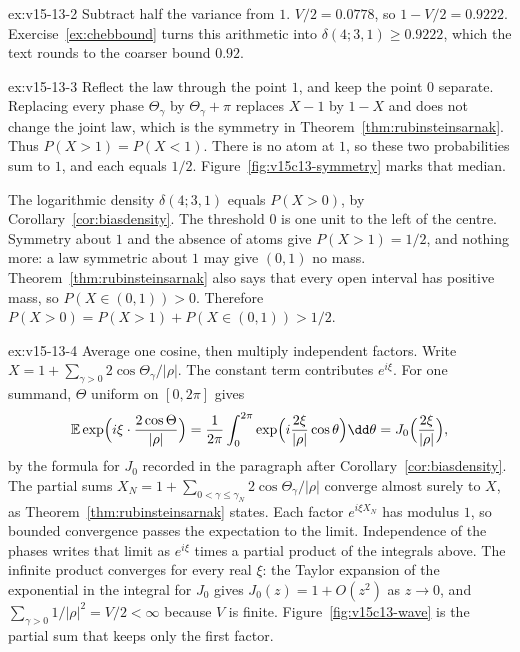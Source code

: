 \begin{solution}{ex:v15-13-2}
\idea Subtract half the variance from \(1\).
\writeup \(V/2=0.0778\), so \(1-V/2=0.9222\). Exercise~\ref{ex:chebbound} turns this arithmetic into \(\delta(4;3,1)\ge0.9222\), which the text rounds to the coarser bound \(0.92\).
\end{solution}

\begin{solution}{ex:v15-13-3}
\idea Reflect the law through the point \(1\), and keep the point \(0\) separate.
\writeup Replacing every phase \(\Theta_\gamma\) by \(\Theta_\gamma+\pi\) replaces \(X-1\) by \(1-X\) and does not change the joint law, which is the symmetry in Theorem~\ref{thm:rubinsteinsarnak}. Thus \(P(X>1)=P(X<1)\). There is no atom at \(1\), so these two probabilities sum to \(1\), and each equals \(1/2\). Figure~\ref{fig:v15c13-symmetry} marks that median.

The logarithmic density \(\delta(4;3,1)\) equals \(P(X>0)\), by Corollary~\ref{cor:biasdensity}. The threshold \(0\) is one unit to the left of the centre. Symmetry about \(1\) and the absence of atoms give \(P(X>1)=1/2\), and nothing more: a law symmetric about \(1\) may give \((0,1)\) no mass. Theorem~\ref{thm:rubinsteinsarnak} also says that every open interval has positive mass, so \(P(X\in(0,1))>0\). Therefore \(P(X>0)=P(X>1)+P(X\in(0,1))>1/2\).
\end{solution}

\begin{solution}{ex:v15-13-4}
\idea Average one cosine, then multiply independent factors.
\writeup Write \(X=1+\sum_{\gamma>0}2\cos\Theta_\gamma/|\rho|\). The constant term contributes \(e^{i\xi}\). For one summand, \(\Theta\) uniform on \([0,2\pi]\) gives
\[
\mathbb E\exp\Bigl(i\xi\cdot\frac{2\cos\Theta}{|\rho|}\Bigr)
=\frac1{2\pi}\int_0^{2\pi}\exp\Bigl(i\frac{2\xi}{|\rho|}\cos\theta\Bigr)\dd\theta
=J_0\Bigl(\frac{2\xi}{|\rho|}\Bigr),
\]
by the formula for \(J_0\) recorded in the paragraph after Corollary~\ref{cor:biasdensity}. The partial sums \(X_N=1+\sum_{0<\gamma\le\gamma_N}2\cos\Theta_\gamma/|\rho|\) converge almost surely to \(X\), as Theorem~\ref{thm:rubinsteinsarnak} states. Each factor \(e^{i\xi X_N}\) has modulus \(1\), so bounded convergence passes the expectation to the limit. Independence of the phases writes that limit as \(e^{i\xi}\) times a partial product of the integrals above. The infinite product converges for every real \(\xi\): the Taylor expansion of the exponential in the integral for \(J_0\) gives \(J_0(z)=1+O(z^2)\) as \(z\to0\), and \(\sum_{\gamma>0}1/|\rho|^2=V/2<\infty\) because \(V\) is finite. Figure~\ref{fig:v15c13-wave} is the partial sum that keeps only the first factor.
\end{solution}

